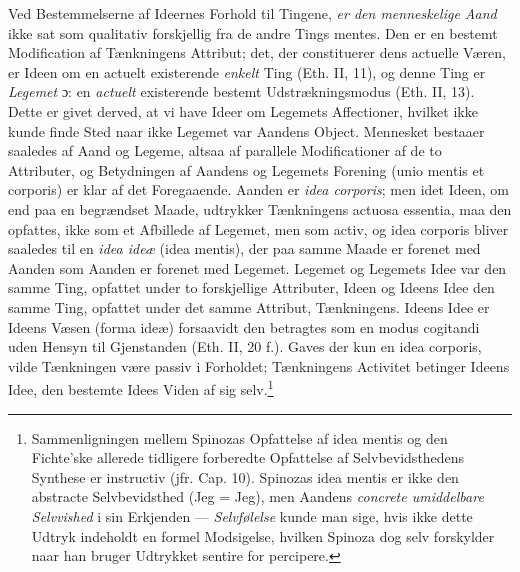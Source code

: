 \documentclass[12pt,a4paper]{book}
\begin{document}
Ved Bestemmelserne af Ideernes Forhold til Tingene, \emph{er
den menneskelige Aand} ikke sat som qualitativ forskjellig
fra de andre Tings mentes. Den er en bestemt Modification af
Tænkningens Attribut; det, der constituerer dens actuelle
Væren, er Ideen om en actuelt existerende \emph{enkelt} Ting (Eth.
II, 11), og denne Ting er \emph{Legemet} ɔ: en \emph{actuelt}
existerende bestemt Udstrækningsmodus (Eth. II, 13). Dette er
givet derved, at vi have Ideer om Legemets Affectioner,
hvilket ikke kunde finde Sted naar ikke Legemet var Aandens
Object. Mennesket bestaaer saaledes af Aand og Legeme, altsaa
af parallele Modificationer af de to Attributer, og
Betydningen af Aandens og Legemets Forening (unio mentis et
corporis) er klar af det Foregaaende. Aanden er \emph{idea corporis};
men idet Ideen, om end paa en begrændset Maade, udtrykker
Tænkningens actuosa essentia, maa den opfattes, ikke som et
Afbillede af Legemet, men som activ, og idea corporis bliver
saaledes til en \emph{idea ideæ} (idea mentis), der paa samme Maade
er forenet med Aanden som Aanden er forenet med Legemet.
Legemet og Legemets Idee var den samme Ting, opfattet under to
forskjellige Attributer, Ideen og Ideens Idee den samme Ting,
opfattet under det samme Attribut, Tænkningens. Ideens Idee er
Ideens Væsen (forma ideæ) forsaavidt den betragtes som en
modus cogitandi uden Hensyn til Gjenstanden (Eth. II, 20 f.).
Gaves der kun en idea corporis, vilde Tænkningen være passiv i
Forholdet; Tænkningens Activitet betinger Ideens Idee, den
bestemte Idees Viden af sig selv.\footnote{Sammenligningen
mellem Spinozas Opfattelse af idea mentis og den Fichte'ske
allerede tidligere forberedte Opfattelse af Selvbevidsthedens
Synthese er instructiv (jfr. Cap. 10). Spinozas idea mentis er
ikke den abstracte Selvbevidsthed (Jeg = Jeg), men Aandens
\emph{concrete umiddelbare Selvvished} i sin Erkjenden ---
\emph{Selvfølelse} kunde man sige, hvis ikke dette Udtryk
indeholdt en formel Modsigelse, hvilken Spinoza dog selv
forskylder naar han bruger Udtrykket sentire for percipere.}
\end{document}
